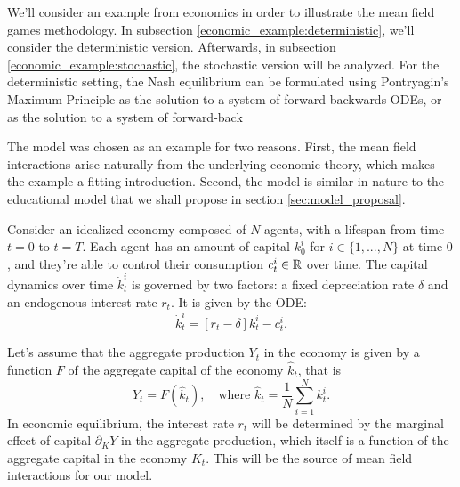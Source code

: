 
\color{blue}

We'll consider an example from economics in order to illustrate the mean field games methodology.
In subsection \ref{economic_example:deterministic}, we'll consider the deterministic version.
Afterwards, in subsection \ref{economic_example:stochastic}, the stochastic version will be analyzed.
For the deterministic setting, the Nash equilibrium can be formulated using Pontryagin's Maximum Principle 
as the solution to a system of forward-backwards ODEs,
or as the solution to a system of forward-back

The model was chosen as an example for two reasons.
First, the mean field interactions arise naturally from the underlying economic theory, which makes the example a fitting introduction.
Second, the model is similar in nature to the educational model that we shall propose in section \ref{sec:model_proposal}.


Consider an idealized economy composed of $N$ agents, with a lifespan from time $t = 0$ to $t = T$.
Each agent has an amount of capital $k_0^i$ for $i \in \{1,...,N\}$ at time $0$, and they're able to control their consumption $c_t^i \in \mathbb{R}$ over time.
The capital dynamics over time $\dot k_t^i$ is governed by two factors:
a fixed depreciation rate $\delta$ and an endogenous interest rate $r_t$. It is given by the ODE:
\begin{equation}
    \dot k_t^i = \left[r_t - \delta \right] k_t^i - c_t^i. 
\end{equation}

Let's assume that the aggregate production $Y_t$ in the economy is given by a function $F$ of the aggregate capital of the economy $\hat k_t$, that is
\begin{equation}
    Y_t = F(\hat k_t),\quad \text{where } \hat k_t = \frac{1}{N} \sum_{i = 1}^N k_t^i.
\end{equation}
In economic equilibrium, the interest rate $r_t$ will be determined by the marginal effect of capital $\partial_K Y$ in the aggregate production,
which itself is a function of the aggregate capital in the economy $K_t$. This will be the source of mean field interactions for our model.

